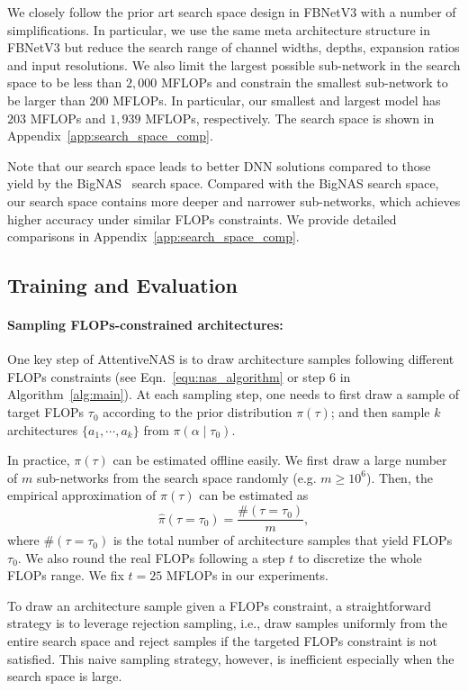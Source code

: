\documentclass[final]{cvpr}
\theoremstyle{definition}
\begin{document}
We closely follow the prior art search space design in FBNetV3 \cite{dai2020fbnetv3} with a number of simplifications. 
In particular, we use the same meta architecture structure in FBNetV3 but reduce the search range of channel widths, depths, expansion ratios and input resolutions.
We also limit the largest possible sub-network in the search space to be less than $2,000$ MFLOPs and constrain the smallest sub-network to be larger than $200$ MFLOPs. 
In particular, our smallest and largest model has $203$ MFLOPs and $1,939$ MFLOPs, respectively. 
The search space is shown in Appendix~\ref{app:search_space_comp}.

Note that our search space leads to better DNN solutions 
compared to those yield by the BigNAS~\cite{yu2020bignas} search space. 
Compared with the BigNAS search space, our search space contains more deeper and narrower sub-networks,
which achieves higher accuracy under similar FLOPs constraints. We provide detailed comparisons in Appendix~\ref{app:search_space_comp}.

\subsection{Training and Evaluation}
\label{sec:imp_prep}


\paragraph{Sampling FLOPs-constrained architectures:} 
\label{sec:sampling_architectures}
One key step of AttentiveNAS is to draw architecture samples following different FLOPs constraints (see Eqn.~\eqref{equ:nas_algorithm} or step 6 in Algorithm~\ref{alg:main}). 
At each sampling step, one needs to first draw a sample of target FLOPs $\tau_0$ according to the prior distribution $\pi(\tau)$; and then sample $k$ architectures $\{a_1, \cdots, a_k\}$ from $\pi(\alpha\mid \tau_0)$.

In practice, 
$\pi(\tau)$ can be estimated offline easily.
We first draw a large number of $m$ sub-networks from the search space randomly (e.g. $m\ge10^6$). 
Then, the empirical approximation of $\pi(\tau)$ can be estimated as 
$$
\hat{\pi}(\tau = \tau_0) = \frac{\#(\tau = \tau_0)}{m},
$$
where $\#(\tau=\tau_0)$ is the total number of architecture samples that yield FLOPs $\tau_0$. We also round the real FLOPs following a step $t$ to discretize the whole FLOPs range. We fix $t=25$ MFLOPs in our experiments.


To draw an architecture sample given a FLOPs constraint, a straightforward strategy is to leverage rejection sampling, i.e., draw samples uniformly from the entire search space and reject samples if the targeted FLOPs constraint is not satisfied. This naive sampling strategy, however, is inefficient especially when the search space is large.
\end{document}
